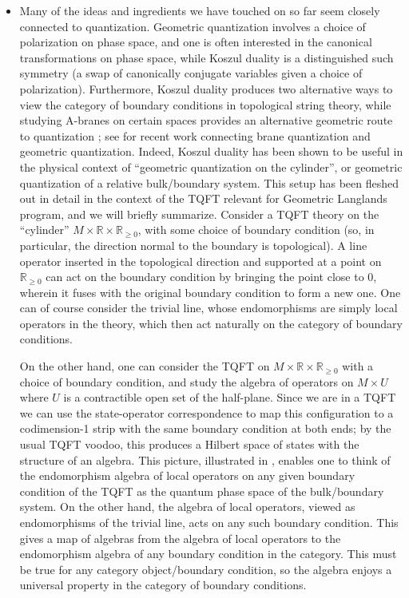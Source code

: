 \documentclass[11pt]{amsart}
\begin{document}
\begin{itemize}
\item Many of the ideas and ingredients we have touched on so far seem closely connected to quantization. Geometric quantization involves a choice of polarization on phase space, and one is often interested in the canonical transformations on phase space, while Koszul duality is a distinguished such symmetry (a swap of canonically conjugate variables given a choice of polarization). Furthermore, Koszul duality produces two alternative ways to view the category of boundary conditions in topological string theory, while studying A-branes on certain spaces provides an alternative geometric route to quantization \cite{GukovWitten}; see \cite{GW} for recent work connecting brane quantization and geometric quantization. Indeed, Koszul duality has been shown to be useful in the physical context of ``geometric quantization on the cylinder'', or geometric quantization of a relative bulk/boundary system. This setup has been fleshed out in detail \cite{EY} in the context of the TQFT relevant for Geometric Langlands program, and we will briefly summarize. Consider a TQFT theory on the ``cylinder'' $M \times \mathbb{R} \times \mathbb{R}_{\geq 0}$, with some choice of boundary condition (so, in particular, the direction normal to the boundary is topological). A line operator inserted in the topological direction and supported at a point on $\mathbb{R}_{\geq 0}$ can act on the boundary condition by bringing the point close to 0, wherein it fuses with the original boundary condition to form a new one. One can of course consider the trivial line, whose endomorphisms are simply local operators in the theory, which then act naturally on the category of boundary conditions. 

On the other hand, one can consider the TQFT on $M \times \mathbb{R} \times \mathbb{R}_{\geq 0}$ with a choice of boundary condition, and study the algebra of operators on $M \times U$ where $U$ is a contractible open set of the half-plane. Since we are in a TQFT we can use the state-operator correspondence to map this configuration to a codimension-1 strip with the same boundary condition at both ends; by the usual TQFT voodoo, this produces a Hilbert space of states with the structure of an algebra. This picture, illustrated in \cite{EY}, enables one to think of the endomorphism algebra of local operators on any given boundary condition of the TQFT as the quantum phase space of the bulk/boundary system. On the other hand, the algebra of local operators, viewed as endomorphisms of the trivial line, acts on any such boundary condition. This gives a map of algebras from the algebra of local operators to the endomorphism algebra of any boundary condition in the category. This must be true for any category object/boundary condition, so the algebra enjoys a universal property in the category of boundary conditions.


\end{itemize}
\end{document}
